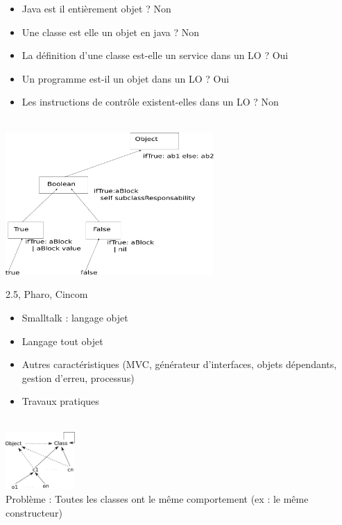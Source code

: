 	\begin{itemize}
		\item Java est il entièrement objet ? Non
		\item Une classe est elle un objet en java ? Non
		\item La définition d'une classe est-elle un service dans un LO ? Oui
		\item Un programme est-il un objet dans un LO ? Oui
		\item Les instructions de contrôle existent-elles dans un LO ? Non
	\end{itemize}

\\
	\includegraphics[width=300px]{Images/01_truefalse.pdf}

 2.5, Pharo, Cincom

	\begin{itemize}
		\item Smalltalk : langage objet
		\item Langage tout objet
		\item Autres caractéristiques (MVC, générateur d'interfaces, objets dépendants, gestion d'erreu, processus)
		\item Travaux pratiques
	\end{itemize}

\\
	\includegraphics[width=100px]{Images/02_hierarchie.pdf}\\
	Problème : Toutes les classes ont le même comportement (ex : le même constructeur)\\

